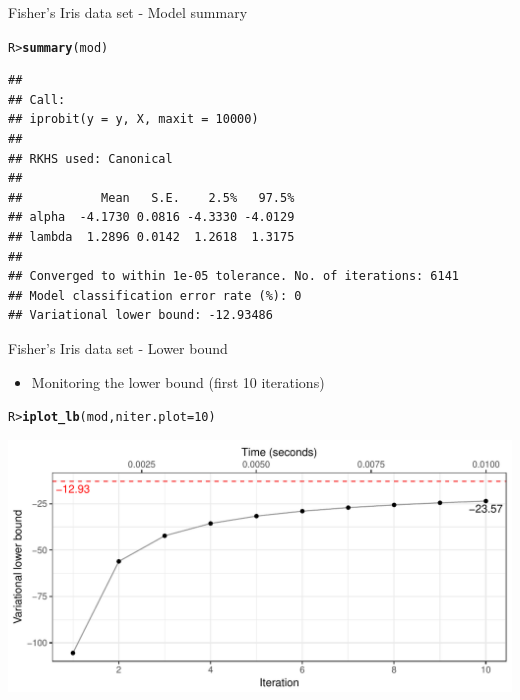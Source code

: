 \documentclass{beamer}\usepackage[]{graphicx}\usepackage[]{color}
\makeatletter
\def\maxwidth{ %
  \ifdim\Gin@nat@width>\linewidth
    \linewidth
  \else
    \Gin@nat@width
  \fi
}
\newcommand{\hlnum}[1]{\textcolor[rgb]{0.686,0.059,0.569}{#1}}%
\newcommand{\hlstd}[1]{\textcolor[rgb]{0.345,0.345,0.345}{#1}}%
\newcommand{\hlkwc}[1]{\textcolor[rgb]{0.333,0.667,0.333}{#1}}%
\newcommand{\hlkwd}[1]{\textcolor[rgb]{0.737,0.353,0.396}{\textbf{#1}}}%
\newenvironment{kframe}{%
 \def\at@end@of@kframe{}%
 \ifinner\ifhmode%
  \def\at@end@of@kframe{\end{minipage}}%
  \begin{minipage}{\columnwidth}%
 \fi\fi%
 \def\FrameCommand##1{\hskip\@totalleftmargin \hskip-\fboxsep
 \colorbox{shadecolor}{##1}\hskip-\fboxsep
     \hskip-\linewidth \hskip-\@totalleftmargin \hskip\columnwidth}%
 \MakeFramed {\advance\hsize-\width
   \@totalleftmargin\z@ \linewidth\hsize
   \@setminipage}}%
 {\par\unskip\endMakeFramed%
 \at@end@of@kframe}
\newenvironment{knitrout}{}{} %
\makeatother
\begin{document}
\begin{frame}[fragile]{Fisher's Iris data set - Model summary}
\begin{knitrout}\small
{}\color{fgcolor}\begin{kframe}
\begin{alltt}
\hlstd{R> }\hlkwd{summary}\hlstd{(mod)}
\end{alltt}
\begin{verbatim}
## 
## Call:
## iprobit(y = y, X, maxit = 10000)
## 
## RKHS used: Canonical 
## 
##           Mean   S.E.    2.5%   97.5%
## alpha  -4.1730 0.0816 -4.3330 -4.0129
## lambda  1.2896 0.0142  1.2618  1.3175
## 
## Converged to within 1e-05 tolerance. No. of iterations: 6141
## Model classification error rate (%): 0
## Variational lower bound: -12.93486
\end{verbatim}
\end{kframe}
\end{knitrout}
\end{frame}

\begin{frame}[fragile]{Fisher's Iris data set - Lower bound}
\begin{itemize}
\item Monitoring the lower bound (first 10 iterations)
\end{itemize}
\begin{knitrout}\small
{}\color{fgcolor}\begin{kframe}
\begin{alltt}
\hlstd{R> }\hlkwd{iplot_lb}\hlstd{(mod,} \hlkwc{niter.plot} \hlstd{=} \hlnum{10}\hlstd{)}
\end{alltt}
\end{kframe}
\end{knitrout}
\begin{knitrout}\small
{}\color{fgcolor}

{\centering \includegraphics[width=\maxwidth]{figure/unnamed-chunk-3-1} 

}



\end{knitrout}
\end{frame}
\end{document}
